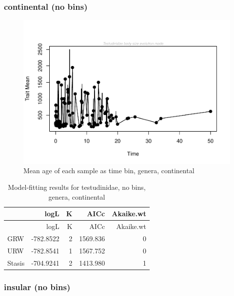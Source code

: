 \documentclass[]{article}
\begin{document}
\newpage

\subsubsection{continental (no bins)}\label{continental-no-bins}

\begin{figure}[htbp]
\centering
\includegraphics{MA_JJ_files/figure-latex/paleoTS with different time bins, no bins, genera, continental-1.pdf}
\caption{Mean age of each sample as time bin, genera, continental}
\end{figure}

\begin{longtable}[]{@{}lrrrr@{}}
\caption{Model-fitting results for testudinidae, no bins, genera,
continental}\tabularnewline
\toprule
& logL & K & AICc & Akaike.wt\tabularnewline
\midrule
\endfirsthead
\toprule
& logL & K & AICc & Akaike.wt\tabularnewline
\midrule
\endhead
GRW & -782.8522 & 2 & 1569.836 & 0\tabularnewline
URW & -782.8541 & 1 & 1567.752 & 0\tabularnewline
Stasis & -704.9241 & 2 & 1413.980 & 1\tabularnewline
\bottomrule
\end{longtable}

\newpage

\subsubsection{insular (no bins)}\label{insular-no-bins}
\end{document}
